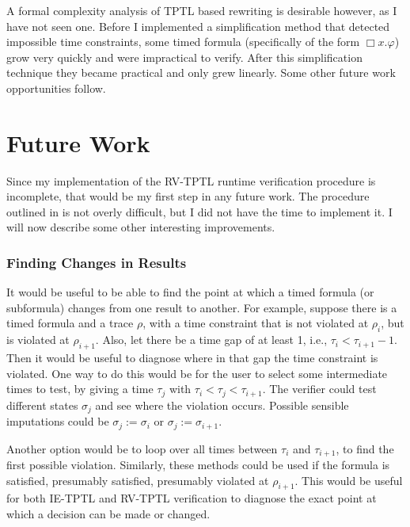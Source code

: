 \documentclass[a4paper]{article}
\begin{document}
A formal complexity analysis of TPTL based rewriting is desirable however, as I have not seen one. Before I implemented a simplification method that detected impossible time constraints, some timed formula (specifically of the form $\Box x. \varphi$) grow very quickly and were impractical to verify. After this simplification technique they became practical and only grew linearly. Some other future work opportunities follow.

\section{Future Work}
Since my implementation of the RV-TPTL runtime verification procedure is incomplete, that would be my first step in any future work. The procedure outlined in  is not overly difficult, but I did not have the time to implement it. I will now describe some other interesting improvements.

\subsubsection{Finding Changes in Results}
It would be useful to be able to find the point at which a timed formula (or subformula) changes from one result to another. For example, suppose there is a timed formula and a trace $\rho$, with a time constraint that is not violated at $\rho_i$, but is violated at $\rho_{i+1}$. Also, let there be a time gap of at least 1, i.e., $\tau_i < \tau_{i+1} - 1$. Then it would be useful to diagnose where in that gap the time constraint is violated. One way to do this would be for the user to select some intermediate times to test, by giving a time $\tau_j$ with $\tau_i < \tau_j < \tau_{i+1}$. The verifier could test different states $\sigma_j$ and see where the violation occurs. Possible sensible imputations could be $\sigma_j := \sigma_i$ or $\sigma_j := \sigma_{i+1}$.

Another option would be to loop over all times between $\tau_i$ and $\tau_{i+1}$, to find the first possible violation. Similarly, these methods could be used if the formula is satisfied, presumably satisfied, presumably violated at $\rho_{i+1}$. This would be useful for both IE-TPTL and RV-TPTL verification to diagnose the exact point at which a decision can be made or changed.
\end{document}
